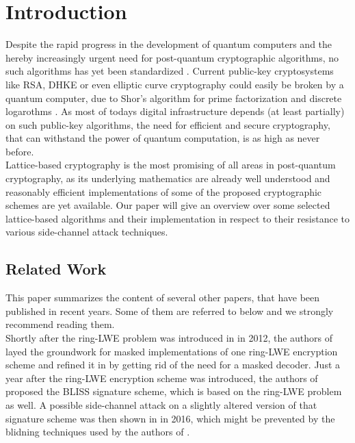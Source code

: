 %
%

\chapter{Introduction}
Despite the rapid progress in the development of quantum computers and the hereby increasingly urgent need for post-quantum cryptographic algorithms, no such algorithms has yet been standardized \cite{Nist}. Current public-key cryptosystems like RSA, DHKE or even elliptic curve cryptography could easily be broken by a quantum computer, due to Shor's algorithm for prime factorization and discrete logarothms \cite{Shor}. As most of todays digital infrastructure depends (at least partially) on such public-key algorithms, the need for efficient and secure cryptography, that can withstand the power of quantum computation, is as high as never before.\\
Lattice-based cryptography is the most promising of all areas in post-quantum cryptography, as its underlying mathematics are already well understood and reasonably efficient implementations of some of the proposed cryptographic schemes are yet available. Our paper will give an overview over some selected lattice-based algorithms and their implementation in respect to their resistance to various side-channel attack techniques.\\

\section{Related Work}
This paper summarizes the content of several other papers, that have been published in recent years. Some of them are referred to below and we strongly recommend reading them.\\
Shortly after the ring-LWE problem was introduced in \cite{cryptoeprint:2012:230} in 2012, the authors of \cite{maskedRing} layed the groundwork for masked implementations of one ring-LWE encryption scheme and refined it in \cite{Reparaz2016} by getting rid of the need for a masked decoder. Just a year after the ring-LWE encryption scheme was introduced, the authors of \cite{bliss} proposed the BLISS signature scheme, which is based on the ring-LWE problem as well. A possible side-channel attack on a slightly altered version of that signature scheme was then shown in \cite{cryptoeprint:2016:300} in 2016, which might be prevented by the blidning techniques used by the authors of \cite{cryptoeprint:2016:276}.

